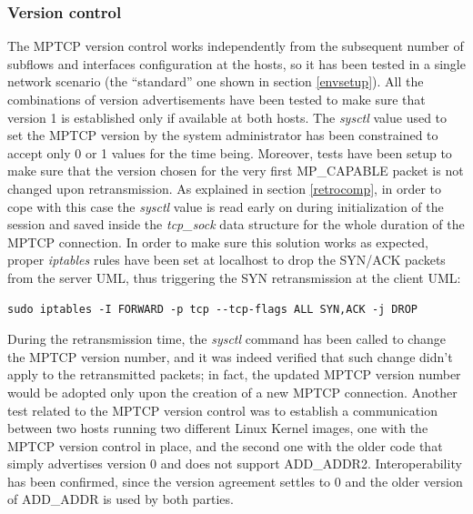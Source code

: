 \subsubsection{Version control}
The MPTCP version control works independently from the subsequent number of subflows and interfaces configuration at the hosts, so it has been tested in a single network scenario (the ``standard'' one shown in section \ref{envsetup}). All the combinations of version advertisements have been tested to make sure that version 1 is established only if available at both hosts. The \textit{sysctl} value used to set the MPTCP version by the system administrator has been constrained to accept only 0 or 1 values for the time being. Moreover, tests have been setup to make sure that the version chosen for the very first MP\_CAPABLE packet is not changed upon retransmission. As explained in section \ref{retrocomp}, in order to cope with this case the \textit{sysctl} value is read early on during initialization of the session and saved inside the \textit{tcp\_sock} data structure for the whole duration of the MPTCP connection. In order to make sure this solution works as expected, proper \textit{iptables} rules have been set at localhost to drop the SYN/ACK packets from the server UML, thus triggering the SYN retransmission at the client UML: 

\begin{verbatim}
sudo iptables -I FORWARD -p tcp --tcp-flags ALL SYN,ACK -j DROP
\end{verbatim}

During the retransmission time, the \textit{sysctl} command has been called to change the MPTCP version number, and it was indeed verified that such change didn't apply to the retransmitted packets; in fact, the updated MPTCP version number would be adopted only upon the creation of a new MPTCP connection. 
Another test related to the MPTCP version control was to establish a communication between two hosts running two different Linux Kernel images, one with the MPTCP version control in place, and the second one with the older code that simply advertises version 0 and does not support ADD\_ADDR2. Interoperability has been confirmed, since the version agreement settles to 0 and the older version of ADD\_ADDR is used by both parties.

